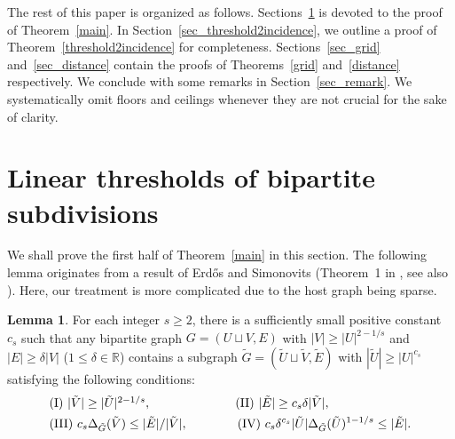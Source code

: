 \documentclass[11pt]{article}
\theoremstyle{definition}
\newtheorem{lemma}[theorem]{Lemma}
\begin{document}
The rest of this paper is organized as follows. Sections~\ref{sec_main1} is devoted to the proof of Theorem~\ref{main}. In Section~\ref{sec_threshold2incidence}, we outline a proof of Theorem~\ref{threshold2incidence} for completeness. Sections~\ref{sec_grid} and~\ref{sec_distance} contain the proofs of Theorems~\ref{grid} and~\ref{distance} respectively. We conclude with some remarks in Section~\ref{sec_remark}. We systematically omit floors and ceilings whenever they are not crucial for the sake of clarity.

\section{Linear thresholds of bipartite subdivisions}\label{sec_main1}

We shall prove the first half of Theorem~\ref{main} in this section. The following lemma originates from a result of Erd\H{o}s and Simonovits (Theorem~1 in \cite{erdos1970some}, see also \cite{jiang2012turan,conlon2021more}). Here, our treatment is more complicated due to the host graph being sparse.

\begin{lemma}\label{biregular}
    For each integer $s \geq 2$, there is a sufficiently small positive constant $c_s$ such that any bipartite graph $G=(U \sqcup V,E)$ with $|V| \geq |U|^{2-1/s}$ and $|E|\geq \delta|V|$ ($1 \leq \delta \in \mathbb{R}$) contains a subgraph $\tilde{G} = (\tilde{U} \sqcup \tilde{V}, \tilde{E})$ with $|\tilde{U}| \geq |U|^{c_s}$ satisfying the following conditions: \begin{align*}
        &\makebox[0pt][l]{$\text{(I)}~|\tilde{V}| \geq |\tilde{U}|^{2-1/s},$}\phantom{\text{(III)}~c_s \Delta_{\tilde{G}}(\tilde{V}) \leq |\tilde{E}|/|\tilde{V}|,}
        \qquad\qquad \text{(II)}~|\tilde{E}|\geq c_s \delta|\tilde{V}|,\\
        &\text{(III)}~c_s \Delta_{\tilde{G}}(\tilde{V}) \leq |\tilde{E}|/|\tilde{V}|,
        \qquad\qquad \text{(IV)}~c_s \delta^{c_s} |\tilde{U}|\Delta_{\tilde{G}}(\tilde{U})^{1- 1/s} \leq |\tilde{E}|.
    \end{align*}
\end{lemma}
\end{document}
